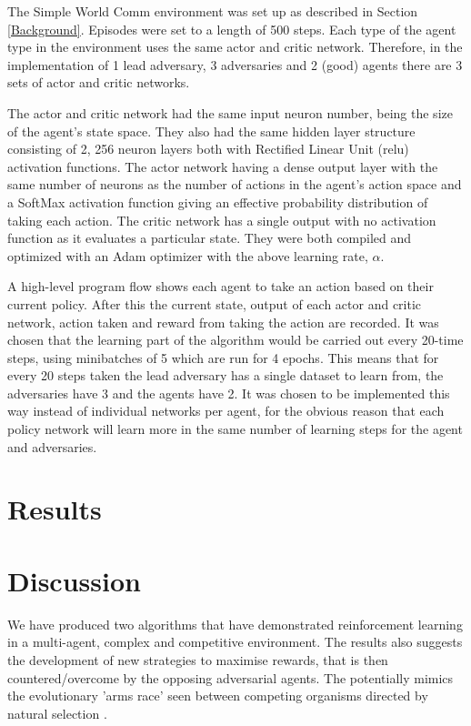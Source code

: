 \documentclass{article}
\begin{document}
The Simple World Comm environment was set up as described in Section \ref{Background}.
Episodes were set to a length of 500 steps.
Each type of the agent type in the environment uses the same actor and critic network.
Therefore, in the implementation of 1 lead adversary, 3 adversaries and 2 (good) agents there are 3 sets of actor and critic networks.


The actor and critic network had the same input neuron number, being the size of the agent's state space.
They also had the same hidden layer structure consisting of 2, 256 neuron layers both with Rectified Linear Unit (relu) activation functions.
The actor network having a dense output layer with the same number of neurons as the number of actions in the agent's action space and a SoftMax activation function giving an effective probability distribution of taking each action.
The critic network has a single output with no activation function as it evaluates a particular state. They were both compiled and optimized with an Adam optimizer \citet{adam-optimiser} with the above learning rate, $\alpha$.

A high-level program flow shows each agent to take an action based on their current policy.
After this the current state, output of each actor and critic network, action taken and reward from taking the action are recorded.
It was chosen that the learning part of the algorithm would be carried out every 20-time steps, using minibatches of 5 which are run for 4 epochs.
This means that for every 20 steps taken the lead adversary has a single dataset to learn from, the adversaries have 3 and the agents have 2.
It was chosen to be implemented this way instead of individual networks per agent, for the obvious reason that each policy network will learn more in the same number of learning steps for the agent and adversaries.

\section{Results} \label{Results}

\section{Discussion} \label{Discussion}

We have produced two algorithms that have demonstrated reinforcement learning in a multi-agent, complex and competitive environment.
The results also suggests the development of new strategies to maximise rewards, that is then countered/overcome by the opposing adversarial agents.
The potentially mimics the evolutionary 'arms race' seen between competing organisms directed by natural selection \citet{armsrace}.
\end{document}

